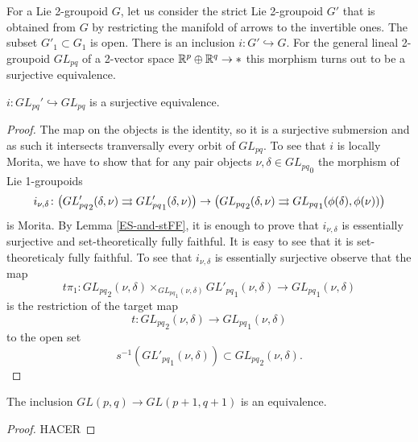
For a Lie 2-groupoid $G$, let us consider the strict Lie 2-groupoid $G'$ that is obtained from $G$ by restricting the manifold of arrows to the invertible ones.
The subset $G'_1\subset G_1$ is open.
There is an inclusion $i\colon G'\hookrightarrow G$.
For the general lineal 2-groupoid $GL_{pq}$ of a 2-vector space $\mathbb R^p\oplus\mathbb R^q\to *$ this morphism turns out to be a surjective equivalence.

\begin{lemma}
$i\colon GL_{pq}' \hookrightarrow GL_{pq}$ is a surjective equivalence.
\end{lemma}

\begin{proof}
The map on the objects is the identity, so it is a surjective submersion and as such it intersects tranversally every orbit of $GL_{pq}$.
To see that $i$ is locally Morita, we have to show that for any pair objects $\nu,\delta\in{GL_{pq}}_0$ the morphism of Lie 1-groupoids
\[ i_{\nu,\delta}\colon \big( {GL'_{pq}}_2(\delta,\nu)\rightrightarrows {GL'_{pq}}_1(\delta,\nu) \big) \to \big( {GL_{pq}}_2(\delta,\nu)\rightrightarrows {GL_{pq}}_1(\phi(\delta),\phi(\nu)) \big) \]
is Morita.
By Lemma \ref{ES-and-stFF}, it is enough to prove that $i_{\nu,\delta}$ is essentially surjective and set-theoretically fully faithful.
It is easy to see that it is set-theoreticaly fully faithful.
To see that $i_{\nu,\delta}$ is essentially surjective observe that the map
\[ t\pi_1\colon {GL_{pq}}_2(\nu, \delta) \times_{{GL_{pq}}_1(\nu, \delta)} {GL'_{pq}}_1(\nu, \delta) \to {GL_{pq}}_1(\nu, \delta) \]
is the restriction of the target map
\[ t\colon {GL_{pq}}_2(\nu, \delta) \to {GL_{pq}}_1(\nu, \delta) \]
to the open set
\[ s^{-1}({GL'_{pq}}_1(\nu, \delta)) \subset {GL_{pq}}_2(\nu, \delta) . \]
\end{proof}



\begin{lemma}
The inclusion $GL(p,q) \to GL(p+1,q+1)$ is an equivalence.
\end{lemma}

\begin{proof}
HACER
\end{proof}




